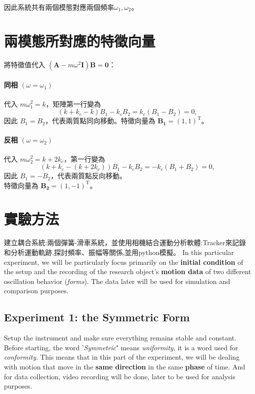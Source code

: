 \documentclass[12pt]{article}
\begin{document}
因此系統共有兩個模態對應兩個頻率$\omega_1,\omega_2$。

\section*{兩模態所對應的特徵向量}
\noindent
將特徵值代入 $(\mathbf{A}-m\omega^2\mathbf{I})\mathbf{B}=\mathbf{0}$：

\paragraph{同相 $(\omega=\omega_1)$}

代入 $m\omega_1^2 = k$，矩陣第一行變為
\[
(k+k_c - k)B_1 - k_c B_2 = k_c(B_1 - B_2) = 0,
\]
因此 $B_1 = B_2$，代表兩質點同向移動。特徵向量為 $\mathbf{B_1} = (1,1)^{\mathrm{T}}$。

\paragraph{反相 $(\omega=\omega_2)$}

代入 $m\omega_2^2 = k+2k_c$，第一行變為
\[
(k+k_c - (k+2k_c))B_1 - k_c B_2 = -k_c(B_1 + B_2) = 0,
\]
因此 $B_1 = -B_2$，代表兩質點反向移動。\\
特徵向量為 $\mathbf{B_2} = (1,-1)^{\mathrm{T}}$。



\section{\textbf{實驗方法}}
建立耦合系統:兩個彈簧-滑車系統，並使用相機結合運動分析軟體:Tracker來記錄和分析運動軌跡,探討頻率、振幅等關係,並用python模擬。
In this particular experiment, we will be particularly focus primarily on the \textbf{initial condition }of the setup and the recording of the research object's \textbf{motion data }of two different oscillation behavior (\textit{forms}). The data later will be used for simulation and comparison purposes.

\subsection{Experiment 1:  the Symmetric Form}
Setup the instrument and make sure everything remains stable and constant. Before starting, the word '\textit{Symmetric}" means \textit{uniformity}, it is a word used for \textit{conformity}. This means that in this part of the experiment, we will be dealing with motion that move in the \textbf{same direction} in the same \textbf{phase} of time. And for data collection, video recording will be done, later to be used for analysis purposes.
\end{document}
